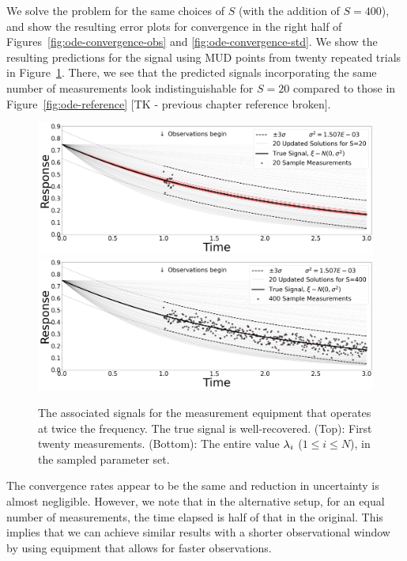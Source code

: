 We solve the problem for the same choices of $S$ (with the addition of $S=400$), and show the resulting error plots for convergence in the right half of Figures~\ref{fig:ode-convergence-obs} and \ref{fig:ode-convergence-std}.
We show the resulting predictions for the signal using MUD points from twenty repeated trials in Figure~\ref{fig:ode-alt-reference}.
There, we see that the predicted signals incorporating the same number of measurements look indistinguishable for $S=20$ compared to those in Figure~\ref{fig:ode-reference} [TK - previous chapter reference broken].

\begin{figure}[htbp]
  \includegraphics[width=\linewidth]{figures/ode/ode-alt_20_reference_solution}
  \includegraphics[width=\linewidth]{figures/ode/ode-alt_400_reference_solution}
  \caption{The associated signals for the measurement equipment that operates at twice the frequency.
  The true signal is well-recovered.
  (Top): First twenty measurements.
  (Bottom): The entire value $\lambda_i$ ($1\leq i \leq N$), in the sampled parameter set.
  }
  \label{fig:ode-alt-reference}
\end{figure}


The convergence rates appear to be the same and reduction in uncertainty is almost negligible.
However, we note that in the alternative setup, for an equal number of measurements, the time elapsed is half of that in the original.
This implies that we can achieve similar results with a shorter observational window by using equipment that allows for faster observations.

